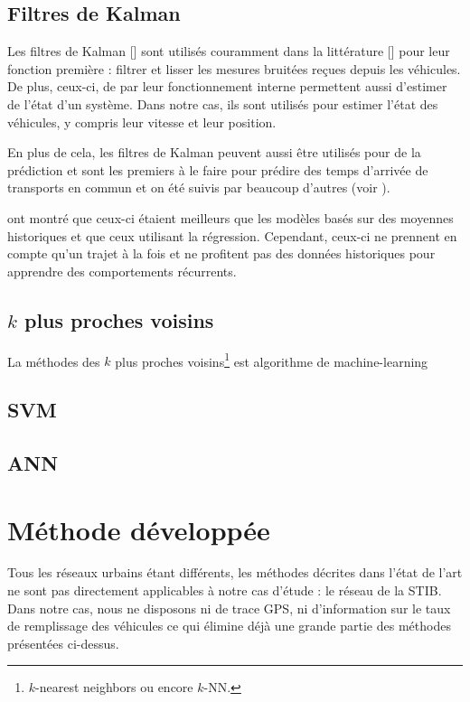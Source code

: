 \documentclass[letterpaper]{article}
\begin{document}
\subsection{Filtres de Kalman}

Les filtres de Kalman [\cite{kalman1960new}] sont utilisés couramment dans la littérature [\cite{wall1999algorithm, cathey2003prescription, shalaby2004prediction}] pour leur fonction première : filtrer et lisser les mesures bruitées reçues depuis les véhicules. De plus, ceux-ci, de par leur fonctionnement interne permettent aussi d'estimer de l'état d'un système.
Dans notre cas, ils sont utilisés pour estimer l'état des véhicules, y compris leur vitesse et leur position.

En plus de cela, les filtres de Kalman peuvent aussi être utilisés pour de la prédiction et \cite{cathey2003prescription} sont les premiers à le faire pour prédire des temps d'arrivée de transports en commun et on été suivis par beaucoup d'autres (voir \cite{yang2005travel, Altinkaya2013}).

\cite{cathey2003prescription} ont montré que ceux-ci étaient meilleurs que les modèles basés sur des moyennes historiques et que ceux utilisant la régression. Cependant, ceux-ci ne prennent en compte qu'un trajet à la fois et ne profitent pas des données historiques pour apprendre des comportements récurrents.

\subsection{$k$ plus proches voisins}

La méthodes des $k$ plus proches voisins\footnote{$k$-nearest neighbors ou encore $k$-NN.}
est algorithme de machine-learning
\subsection{SVM}

\subsection{ANN}




\section{Méthode développée}

Tous les réseaux urbains étant différents, les méthodes décrites dans l'état de l'art ne sont pas directement applicables à notre cas d'étude : le réseau de la STIB. Dans notre cas, nous ne disposons ni de trace GPS, ni d'information sur le taux de remplissage des véhicules ce qui élimine déjà une grande partie des méthodes présentées ci-dessus.
\end{document}
